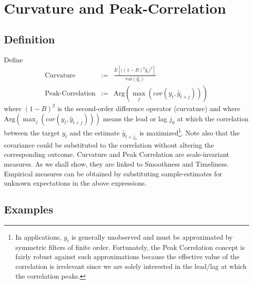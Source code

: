 \documentclass[a4paper]{book}
\begin{document}
\section{Curvature and Peak-Correlation}\label{peco_cu}

\subsection{Definition}

Define
\begin{eqnarray}\label{mse_2diff}
\textrm{Curvature}&:=&\frac{E\left[\Big((1-B)^2 \widehat{y}_t\Big)^2\right]}{\textrm{var}(\widehat{y_t})}\\
\label{peak_corr}
\textrm{Peak-Correlation}&:=&\textrm{Arg}\left(\max_j(cor(y_t,\widehat{y}_{t+j}))\right)
\end{eqnarray}
where $(1-B)^2$ is the second-order difference operator (curvature) and where $\textrm{Arg}\left(\max_j(cor(y_t,\widehat{y}_{t+j}))\right)$ means the lead or lag $j_0$ at which the correlation between the target $y_t$ and the estimate $\hat{y}_{t+j_0}$ is maximized\footnote{In applications, $y_t$ is generally unobserved and must be approximated by symmetric filters of finite order. Fortunately, the Peak Correlation concept is fairly robust against such approximations because the effective value of the correlation is irrelevant since we are solely interested in the lead/lag at which the correlation peaks.}. Note also that the covariance could be substituted to the correlation without altering the corresponding outcome.  Curvature and Peak Correlation are scale-invariant measures. As we shall show, they are linked to Smoothness and Timeliness. Empirical measures can be obtained by substituting  sample-estimates for unknown expectations in the above expressions. 


\subsection{Examples}  
\end{document}
